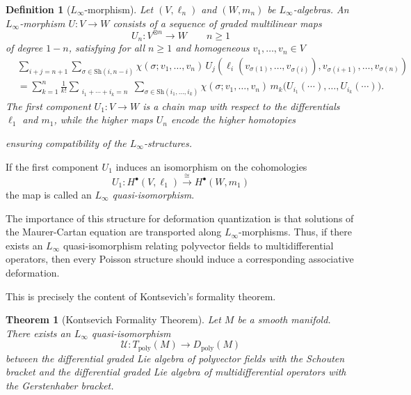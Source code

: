 \documentclass[
  12pt,
  a4paper, oneside
]{report}
\theoremstyle{bolddef}
\newtheorem{theorem}{Theorem}[chapter]
\newtheorem{definition}{Definition}
\theoremstyle{remark}
\numberwithin{equation}{chapter}
\begin{document}
\begin{definition}[$L_\infty$-morphism]
Let $(V,\ell_n)$ and $(W,m_n)$ be $L_\infty$-algebras. 
An $L_\infty$-morphism $U:V \to W$ consists of a sequence of graded multilinear maps
$$
U_n : V^{\otimes n} \to W \qquad n \ge 1
$$
of degree $1-n$, satisfying for all $n \ge 1$ and homogeneous $v_1,\dots,v_n \in V$
\begin{align*}
&\sum_{i+j=n+1}
\sum_{\sigma \in \mathrm{Sh}(i,n-i)}
\chi(\sigma;v_1,\dots,v_n)\,
U_j\!\left(
\ell_i(v_{\sigma(1)},\dots,v_{\sigma(i)}),
v_{\sigma(i+1)},\dots,v_{\sigma(n)}
\right) \\
&=
\sum_{k=1}^{n}
\frac{1}{k!}
\sum_{\substack{i_1+\cdots+i_k=n}}
\sum_{\sigma\in \mathrm{Sh}(i_1,\dots,i_k)}
\chi(\sigma;v_1,\dots,v_n)\,
m_k\!\big(
U_{i_1}(\cdots),\dots,U_{i_k}(\cdots)
\big).
\end{align*}
The first component $U_1 : V \to W$ is a chain map with respect to the differentials
$\ell_1$ and $m_1$, while the higher maps $U_n$ encode the higher homotopies

ensuring compatibility of the $L_\infty$-structures.
\end{definition}
If the first component $U_1$ induces an isomorphism on the cohomologies 
\begin{equation}
    U_{1} : H^{\bullet}(V,\ell_{1}) \xrightarrow{\cong} H^{\bullet}(W,m_{1})
\end{equation}
the map is
called an \textit{$L_\infty$ quasi-isomorphism}.

The importance of this structure for deformation quantization is that solutions
of the Maurer-Cartan equation are transported along $L_\infty$-morphisms.
Thus, if there exists an $L_\infty$ quasi-isomorphism relating polyvector fields
to multidifferential operators, then every Poisson structure should induce a
corresponding associative deformation.

This is precisely the content of Kontsevich's formality theorem\cite{Kontsevich2003}.

\begin{theorem}[Kontsevich Formality Theorem]
Let $M$ be a smooth manifold. There exists an $L_\infty$ quasi-isomorphism
\begin{equation}
\mathcal{U} : T_{\mathrm{poly}}(M) \longrightarrow D_{\mathrm{poly}}(M)
\end{equation}
between the differential graded Lie algebra of polyvector fields with
the Schouten bracket and the differential graded Lie algebra of multidifferential
operators with the Gerstenhaber bracket.
\end{theorem}
\end{document}
